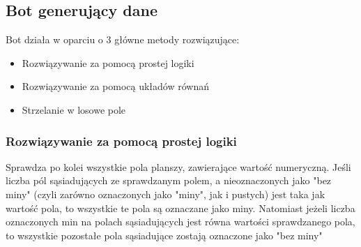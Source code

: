 \documentclass[letterpaper,12pt]{article}
\begin{document}
\subsection{Bot generujący dane}

Bot działa w oparciu o 3 główne metody rozwiązujące:
\begin{itemize}
    \item{Rozwiązywanie za pomocą prostej logiki}
    \item{Rozwiązywanie za pomocą układów równań}
    \item{Strzelanie w losowe pole}    \\
\end{itemize}
\subsubsection*{Rozwiązywanie za pomocą prostej logiki}
Sprawdza po kolei wszystkie pola planszy, zawierające wartość numeryczną. 
Jeśli liczba pól sąsiadujących ze sprawdzanym polem, a nieoznaczonych jako
"bez miny" (czyli zarówno oznaczonych jako "miny", jak i pustych) jest taka
jak wartość pola, to wszystkie te pola są oznaczane jako miny.
Natomiast jeżeli liczba oznaczonych min na polach sąsiadujących jest równa wartości 
sprawdzanego pola, to wszystkie pozostałe pola sąsiadujące zostają oznaczone jako "bez miny"
\hfill \break
\end{document}
